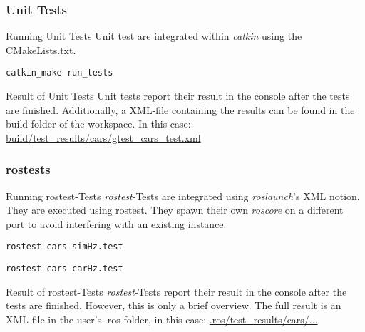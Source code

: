 \documentclass{beamer}
\begin{document}
\begin{frame}[fragile]
  \frametitle{Unit Tests}
  \begin{block}{Running Unit Tests}
    Unit test are integrated within \emph{catkin} using the {\ttfamily CMakeLists.txt}.
  \end{block}

  \begin{lstlisting}[title=Run Unit Tests, style=cmd]
catkin_make run_tests
  \end{lstlisting}
  
  \begin{block}{Result of Unit Tests}
    Unit tests report their result in the console after the tests are finished. Additionally, a XML-file containing the results can be found in the {\ttfamily build}-folder of the workspace. In this case: \url{build/test\_results/cars/gtest\_cars\_test.xml}
  \end{block}
\end{frame}

\begin{frame}[fragile]
  \frametitle{rostests}

  \begin{block}{Running rostest-Tests}
    \emph{rostest}-Tests are integrated using \emph{roslaunch}'s XML notion. They are executed using {\ttfamily rostest}. They spawn their own \emph{roscore} on a different port to avoid interfering with an existing instance.
  \end{block}

  \begin{lstlisting}[title=Run Simulation Test, style=cmd]
rostest cars simHz.test
  \end{lstlisting}
  \begin{lstlisting}[title=Run Car Test, style=cmd]
rostest cars carHz.test
  \end{lstlisting}

  \begin{block}{Result of rostest-Tests}
    \emph{rostest}-Tests report their result in the console after the tests are finished. However, this is only a brief overview. The full result is an XML-file in the user's {\ttfamily .ros}-folder, in this case: \url{.ros/test\_results/cars/...}
  \end{block}
\end{frame}
\end{document}
